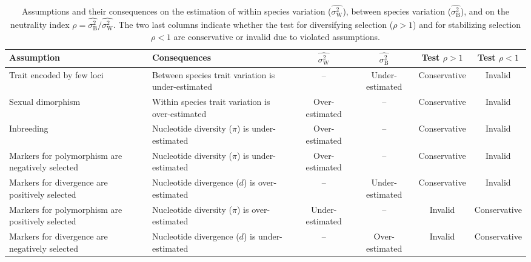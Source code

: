 \documentclass{article}
\newcommand{\RatePhy}{\sigma^2_{\mathrm{B}}}
\newcommand{\RatePop}{\sigma^2_{\mathrm{W}}}
\newcommand{\EstRatePhy}{\widehat{\RatePhy}}
\newcommand{\EstRatePop}{\widehat{\RatePop}}
\newcommand{\NI}{\rho}
\begin{document}
\begin{table*}[t!]
    \centering
    \begin{adjustbox}{width = 1.0\textwidth}
    \begin{tabular}{||l|l||c|c||c|c||}
            \hline
            Assumption & Consequences & $\EstRatePop$ & $\EstRatePhy$ & Test $\NI > 1$  & Test $\NI < 1$ \\ \hline \hline
            Trait encoded by few loci & Between species trait variation is under-estimated  & -- & Under-estimated & Conservative & Invalid  \\ \hline
            Sexual dimorphism &  Within species trait variation is over-estimated  & Over-estimated & -- & Conservative & Invalid  \\ \hline
            Inbreeding & Nucleotide diversity ($\pi$) is under-estimated  & Over-estimated & -- & Conservative & Invalid  \\ \hline
            Markers for polymorphism are negatively selected & Nucleotide diversity ($\pi$) is under-estimated  & Over-estimated & -- & Conservative & Invalid  \\ \hline
            Markers for divergence are positively selected & Nucleotide divergence ($d$) is over-estimated & -- & Under-estimated & Conservative & Invalid  \\ \hline
            Markers for polymorphism are positively selected & Nucleotide diversity ($\pi$) is over-estimated  & Under-estimated & -- & Invalid & Conservative  \\ \hline
            Markers for divergence are negatively selected & Nucleotide divergence ($d$) is under-estimated & -- & Over-estimated & Invalid & Conservative  \\ \hline
    \end{tabular}
    \end{adjustbox}
    \caption{Assumptions and their consequences on the estimation of within species variation ($\EstRatePop$), between species variation ($\EstRatePhy$), and on the neutrality index $\NI = \EstRatePhy/\EstRatePop$.
    The two last columns indicate whether the test for diversifying selection ($\NI > 1$) and for stabilizing selection $\NI < 1$ are conservative or invalid due to violated assumptions.
    }
    \label{table:assumptions}
\end{table*}
\end{document}
